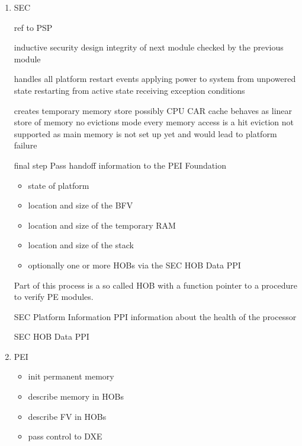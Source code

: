 \begin{enumerate}
    \item{\acf{SEC}}

    ref to PSP

    inductive security design
    integrity of next module checked by the previous module

    handles all platform restart events
    applying power to system from unpowered state
    restarting from active state
    receiving exception conditions

    creates temporary memory store
    possibly CPU \ac{CAR}
    cache behaves as linear store of memory
    no evictions mode
    every memory access is a hit
    eviction not supported as main memory is not set up yet and would lead to platform failure


    final step
    Pass handoff information to the \ac{PEI} Foundation
    \begin{itemize}
        \item state of platform
        \item location and size of the \ac{BFV}
        \item location and size of the temporary RAM
        \item location and size of the stack
        \item optionally one or more \acp{HOB} via the \ac{SEC} \ac{HOB} Data \ac{PPI}
    \end{itemize}


    Part of this process is a so called \ac{HOB} with a function pointer to a procedure to verify PE modules.

    SEC Platform Information PPI
    information about the health of the processor

    SEC HOB Data PPI

    \item{\acf{PEI}}

    \begin{itemize}
        \item init permanent memory
        \item describe memory in \acp{HOB}
        \item describe \ac{FV} in \acp{HOB}
        \item pass control to \ac{DXE}
    \end{itemize}


\end{enumerate}
